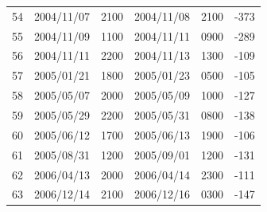 \documentclass[sw, draft]{AGUTeX}
\begin{document}
\begin{table}[]
\begin{tabular}{cccccc}
54 & 2004/11/07 & 2100 & 2004/11/08 & 2100 & -373 \\
55 & 2004/11/09 & 1100 & 2004/11/11 & 0900 & -289 \\
56 & 2004/11/11 & 2200 & 2004/11/13 & 1300 & -109 \\
57 & 2005/01/21 & 1800 & 2005/01/23 & 0500 & -105 \\
58 & 2005/05/07 & 2000 & 2005/05/09 & 1000 & -127 \\
59 & 2005/05/29 & 2200 & 2005/05/31 & 0800 & -138 \\
60 & 2005/06/12 & 1700 & 2005/06/13 & 1900 & -106 \\
61 & 2005/08/31 & 1200 & 2005/09/01 & 1200 & -131 \\
62 & 2006/04/13 & 2000 & 2006/04/14 & 2300 & -111 \\
63 & 2006/12/14 & 2100 & 2006/12/16 & 0300 & -147 \\ \hline
\end{tabular}%
\end{table}



\end{document}
